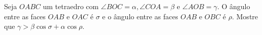 Seja \(OABC\) um tetraedro com \(\angle BOC=\alpha,\angle COA =\beta\) e \(\angle AOB =\gamma\). O ângulo entre as faces \(OAB\) e \(OAC\) é \(\sigma\) e o ângulo entre as faces \(OAB\) e \(OBC\) é \(\rho\). Mostre que \(\gamma > \beta \cos\sigma + \alpha \cos\rho\).
